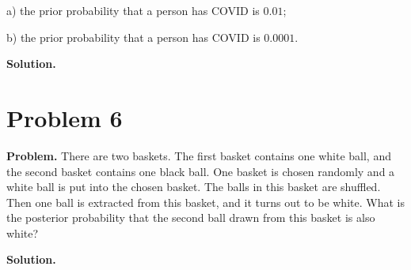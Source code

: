 \documentclass{article}
\begin{document}
a) the prior probability that a person has COVID is \( 0.01 \);

b) the prior probability that a person has COVID is \( 0.0001 \).

\textbf{Solution.} 

\section{Problem 6}

\textbf{Problem.} There are two baskets. The first basket contains one white ball, and the second basket contains one black ball. One basket is chosen randomly and a white ball is put into the chosen basket. The balls in this basket are shuffled. Then one ball is extracted from this basket, and it turns out to be white. What is the posterior probability that the second ball drawn from this basket is also white?

\textbf{Solution.} 
\end{document}
